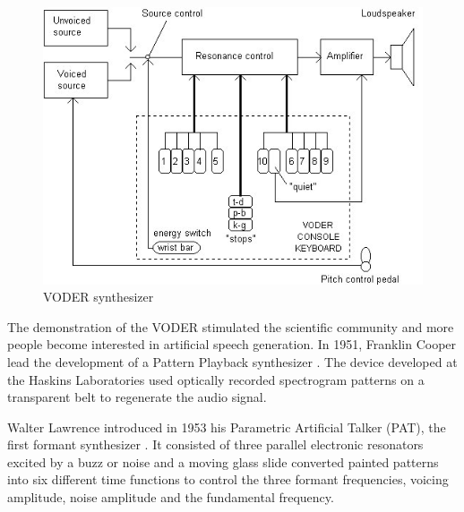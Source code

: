 \begin{figure}[htb]
	\begin{center}
		\includegraphics[width=\textwidth]{images/voder.jpg}
		\caption{VODER synthesizer \cite{Klatt87}}
		\label{fig:voder}
	\end{center}
\end{figure}

The demonstration of the VODER stimulated the scientific community and more people become interested in artificial speech generation. In 1951, Franklin Cooper lead the development of a Pattern Playback synthesizer \cite{Klatt87, flanagan_1973_speech}. The device developed at the Haskins Laboratories used optically recorded spectrogram patterns on a transparent belt to regenerate the audio signal. 

Walter Lawrence introduced in 1953 his Parametric Artificial Talker (PAT), the first formant synthesizer \cite{Klatt87}. It consisted of three parallel electronic resonators excited by a buzz or noise and a moving glass slide converted painted patterns into six different time functions to control the three formant frequencies, voicing amplitude, noise amplitude and the fundamental frequency. 